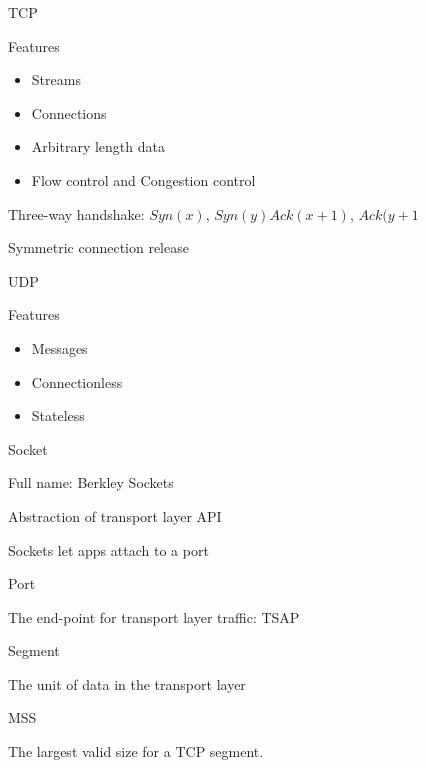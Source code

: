 \documentclass[main.tex]{subfiles}
\begin{document}
\small


\begin{card}{TCP}
\item Features
    \begin{itemize}
        \item Streams
        \item Connections
        \item Arbitrary length data
        \item Flow control and Congestion control
    \end{itemize}
\item Three-way handshake: $Syn(x)$, $Syn(y)Ack(x+1)$, $Ack(y+1$
\item Symmetric connection release
\end{card}

\begin{card}{UDP}
\item Features
    \begin{itemize}
        \item Messages
        \item Connectionless
        \item Stateless
    \end{itemize}
\end{card}

\begin{card}{Socket}
\item Full name: Berkley Sockets
\item Abstraction of transport layer API
\item Sockets let apps attach to a port
\end{card}

\begin{card}{Port}
\item The end-point for transport layer traffic: TSAP
\end{card}

\begin{card}{Segment}
\item The unit of data in the transport layer
\end{card}

\begin{card}{MSS}
\item The largest valid size for a TCP segment.
\end{card}
\end{document}
